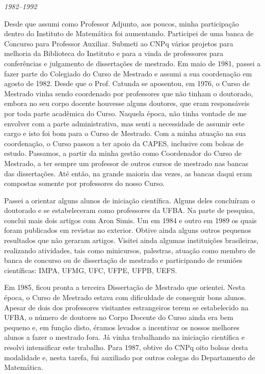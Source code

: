 \documentclass{hipatia}
\begin{document}
\begin{center}\emph{1982--1992}\end{center}



Desde que assumi como Professor Adjunto, aos poucos, minha
participação dentro do Instituto de Matemática foi
aumentando. Participei de uma banca de Concurso para
Professor Auxiliar. Submeti ao CNPq vários projetos para
melhoria da Biblioteca do Instituto e para a vinda de
professores para conferências e julgamento de dissertações
de mestrado. Em maio de 1981, passei a fazer parte do
Colegiado do Curso de Mestrado e assumi a sua coordenação em
agosto de 1982. Desde que o Prof. Catunda se aposentou, em
1976, o Curso de Mestrado vinha sendo coordenado por
professores que não tinham o doutorado, embora no seu corpo
docente houvesse alguns doutores, que eram responsáveis por
toda parte acadêmica do Curso. Naquela época, não tinha
vontade de me envolver com a parte administrativa, mas senti
a necessidade de assumir este cargo e isto foi bom para o
Curso de Mestrado. Com a minha atuação na sua coordenação, o
Curso passou a ter apoio da CAPES, inclusive com bolsas de
estudo. Passamos, a partir da minha gestão como Coordenador
do Curso de Mestrado, a ter sempre um professor de outros
cursos de mestrado nas bancas das dissertações. Até então,
na grande maioria das vezes, as bancas daqui eram compostas
somente por professores do nosso Curso.

Passei a orientar alguns alunos de iniciação científica.
Alguns deles concluíram o doutorado e se estabeleceram como
professores da UFBA. Na parte de pesquisa, conclui mais dois
artigos com Aron Simis. Um em 1984 e outro em 1989 os quais
foram publicados em revistas no exterior. Obtive ainda
alguns outros pequenos resultados que não geraram artigos.
Visitei ainda algumas instituições brasileiras, realizando
atividades, tais como minicursos, palestras, 
atuação como %
membro de banca
de concurso ou de dissertação de mestrado e participando de
reuniões científicas: IMPA, UFMG, UFC, UFPE, UFPB, UEFS.

Em 1985, ficou pronta a terceira Dissertação de Mestrado que
orientei. Nesta época, o Curso de Mestrado estava com
dificuldade de conseguir bons alunos. Apesar de dois dos
professores visitantes estrangeiros terem se estabelecido na
UFBA, o número de doutores no Corpo Docente do Curso ainda
era bem pequeno e, em função disto, éramos levados a
incentivar os nossos melhores alunos a fazer o mestrado
fora. Já vinha trabalhando na iniciação científica e resolvi
intensificar este trabalho. Para 1987, obtive do CNPq oito
bolsas desta modalidade e, nesta tarefa, fui auxiliado por
outros colegas do Departamento de Matemática.
\end{document}
